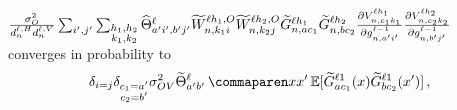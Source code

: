 \begin{lemma}\label{lem:gg_ntk}
    $
    \frac{\sigma_{O}^2}{d_{n}^{\ell, H} d_{n}^{\ell, V}}
    \sum_{i', j'}
    \sum_{\substack{h_1, h_2\\ k_1, k_2}}
        \widehat{\Theta}_{
            a' i' , b' j'
        }^{\ell}
        \widetilde{W}_{n , k_1 i}^{\ell h_1 , O}
        \widetilde{W}_{n , k_2 j}^{\ell h_2 , O}
        \widetilde{G}_{n, a c_1}^{\ell h_1}
        \widetilde{G}_{n, b c_2}^{\ell h_2}
        \frac{
            \partial
            V_{n, c_1 k_1}^{\ell h_1}
        }{
            \partial g_{n, a' i'}^{\ell - 1}
        }
        \frac{
            \partial
            V_{n, c_2 k_2}^{\ell h_2}
        }{
            \partial g_{n, b' j'}^{\ell - 1}
        }
    $
    converges in probability to
    \begin{align*}
        \delta_{i = j}
        \delta_{\substack{c_1 = \gIndexA \\ c_2 = \gIndexB}}
        \OVVar
        \ntktildef{\gIndexA \gIndexB}{\depthSymbol}{\inputSymbol}{\inputSymbol'}
        \E [
            \tildeLogit{\fIndexA c_1}{\depthSymbol 1} (\inputSymbol)
            \tildeLogit{\fIndexB c_2}{\depthSymbol 1} (\inputSymbol')
        ]
        \, ,
    \end{align*}
\end{lemma}

